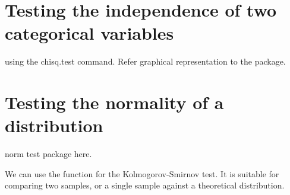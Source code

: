  
 
\section{Testing the independence of two categorical variables} 
using the chisq.test command. 
Refer graphical representation to the  package. 
 
\section{Testing the normality of a distribution} 
 
norm test package here. 
 
We can use the  function for the Kolmogorov-Smirnov test. It is suitable for comparing two samples, or a single sample against a theoretical distribution. 
 


